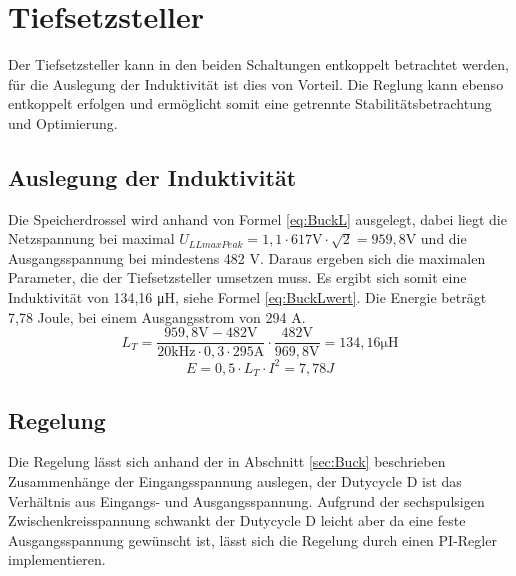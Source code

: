 \section{Tiefsetzsteller}
	Der Tiefsetzsteller kann in den beiden Schaltungen entkoppelt betrachtet werden, für die Auslegung der Induktivität ist dies von Vorteil. Die Reglung kann ebenso entkoppelt erfolgen und ermöglicht somit eine getrennte Stabilitätsbetrachtung und Optimierung. 
	\subsection{Auslegung der Induktivität}
	Die Speicherdrossel wird anhand von Formel \ref{eq:BuckL} ausgelegt, dabei liegt die Netzspannung bei maximal $U_{LLmaxPeak}=1,1 \cdot 617 \si{\V} \cdot \sqrt{2}=959,8 \si{\V}$ und die Ausgangsspannung bei mindestens 482 \si{\V}. Daraus ergeben sich die maximalen Parameter, die der Tiefsetzsteller umsetzen muss. Es ergibt sich somit eine Induktivität von 134,16 \si{\micro \henry}, siehe Formel \ref{eq:BuckLwert}. Die Energie beträgt 7,78 Joule, bei einem Ausgangsstrom von 294 A. 
	\begin{equation}
	\label{eq:BuckLwert}
	L_{T}=\dfrac{959,8\si{\V} - 482 \si{\V}}{20 \si{\kilo \hertz}\cdot 0,3 \cdot 295 \si{\ampere}}\cdot \dfrac{482 \si{\V}}{969,8 \si{\V}}= 134,16 \si{\micro \henry} 
	\end{equation}
	\begin{equation}
		E=0,5 \cdot L_{T} \cdot I^{2} = 7,78 J
	\end{equation}
	\subsection{Regelung}
	Die Regelung lässt sich anhand der in Abschnitt \ref{sec:Buck} beschrieben Zusammenhänge der Eingangsspannung auslegen, der Dutycycle \gls{D} ist das Verhältnis aus Eingangs- und Ausgangsspannung. Aufgrund der sechspulsigen Zwischenkreisspannung schwankt der Dutycycle \gls{D} leicht aber da eine feste Ausgangsspannung gewünscht ist, lässt sich die Regelung durch einen PI-Regler implementieren. 


